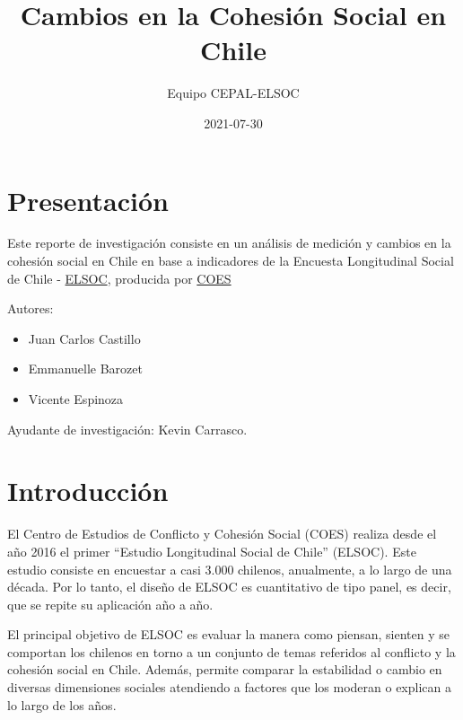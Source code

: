 \documentclass[
  12pt,
]{book}
\title{Cambios en la Cohesión Social en Chile}
\author{Equipo CEPAL-ELSOC}
\date{2021-07-30}
\providecommand{\tightlist}{%
  \setlength{\itemsep}{0pt}\setlength{\parskip}{0pt}}
\begin{document}
\maketitle

{
\hypersetup{linkcolor=}
\setcounter{tocdepth}{1}
\tableofcontents
}
\listoftables
\listoffigures
{}
\hypertarget{presentaciuxf3n}{%
\chapter*{Presentación}\label{presentaciuxf3n}}

Este reporte de investigación consiste en un análisis de medición y cambios en la cohesión social en Chile en base a indicadores de la Encuesta Longitudinal Social de Chile - \href{https://coes.cl/encuesta-panel/}{ELSOC}, producida por \href{https://coes.cl/}{COES}

Autores:

\begin{itemize}
\tightlist
\item
  Juan Carlos Castillo
\item
  Emmanuelle Barozet
\item
  Vicente Espinoza
\end{itemize}

Ayudante de investigación: Kevin Carrasco.

\hypertarget{introducciuxf3n}{%
\chapter*{Introducción}\label{introducciuxf3n}}

El Centro de Estudios de Conflicto y Cohesión Social (COES) realiza desde el año 2016 el primer ``Estudio Longitudinal Social de Chile'' (ELSOC). Este estudio consiste en encuestar a casi 3.000 chilenos, anualmente, a lo largo de una década. Por lo tanto, el diseño de ELSOC es cuantitativo de tipo panel, es decir, que se repite su aplicación año a año.

El principal objetivo de ELSOC es evaluar la manera como piensan, sienten y se comportan los chilenos en torno a un conjunto de temas referidos al conflicto y la cohesión social en Chile. Además, permite comparar la estabilidad o cambio en diversas dimensiones sociales atendiendo a factores que los moderan o explican a lo largo de los años.
\end{document}
